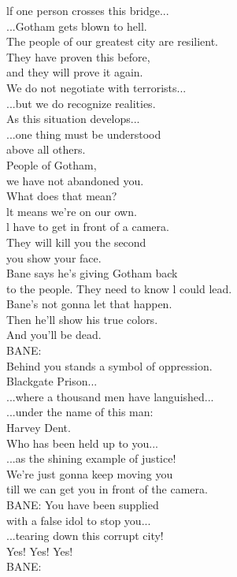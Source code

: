 \documentclass{article}
\begin{document}
\begin{multicols}{3}
lf one person crosses this bridge...\\
...Gotham gets blown to hell.\\
The people of our greatest city are resilient.\\
They have proven this before,\\
and they will prove it again.\\
We do not negotiate with terrorists...\\
...but we do recognize realities.\\
As this situation develops...\\
...one thing must be understood\\
above all others.\\
People of Gotham,\\
we have not abandoned you.\\
What does that mean?\\
lt means we're on our own.\\
l have to get in front of a camera.\\
They will kill you the second\\
you show your face.\\
Bane says he's giving Gotham back\\
to the people. They need to know l could lead.\\
Bane's not gonna let that happen.\\
Then he'll show his true colors.\\
And you'll be dead.\\
BANE:\\
Behind you stands a symbol of oppression.\\
Blackgate Prison...\\
...where a thousand men have languished...\\
...under the name of this man:\\
Harvey Dent.\\
Who has been held up to you...\\
...as the shining example of justice!\\
We're just gonna keep moving you\\
till we can get you in front of the camera.\\
BANE: You have been supplied\\
with a false idol to stop you...\\
...tearing down this corrupt city!\\
Yes! Yes! Yes!\\
BANE:\\

\end{multicols}
\end{document}
